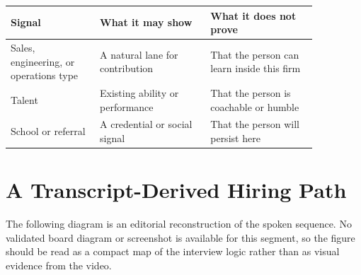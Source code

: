 \begin{table}
\centering
\begin{tabular}{|p{0.25\linewidth}|p{0.31\linewidth}|p{0.30\linewidth}|}
\hline
Signal & What it may show & What it does not prove \\
\hline
Sales, engineering, or operations type & A natural lane for contribution & That the person can learn inside this firm \\
\hline
Talent & Existing ability or performance & That the person is coachable or humble \\
\hline
School or referral & A credential or social signal & That the person will persist here \\
\hline
\end{tabular}
\end{table}

\section{A Transcript-Derived Hiring Path}

The following diagram is an editorial reconstruction of the spoken sequence. No validated board diagram or screenshot is available for this segment, so the figure should be read as a compact map of the interview logic rather than as visual evidence from the video.

\begin{figure}
\centering
{}
\end{figure}

